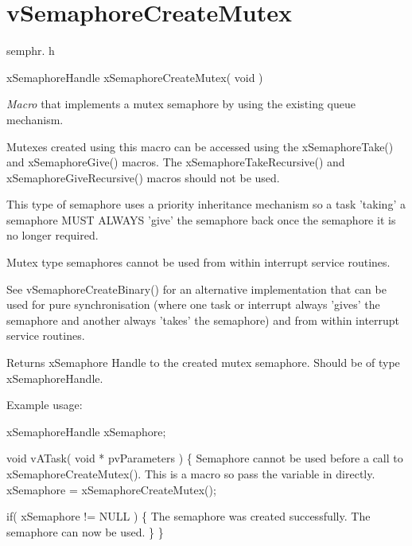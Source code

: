 \hypertarget{group__v_semaphore_create_mutex}{\section{v\-Semaphore\-Create\-Mutex}
\label{group__v_semaphore_create_mutex}
}
semphr. h 
\begin{DoxyPre}xSemaphoreHandle xSemaphoreCreateMutex( void )\end{DoxyPre}


{\itshape Macro} that implements a mutex semaphore by using the existing queue mechanism.

Mutexes created using this macro can be accessed using the x\-Semaphore\-Take() and x\-Semaphore\-Give() macros. The x\-Semaphore\-Take\-Recursive() and x\-Semaphore\-Give\-Recursive() macros should not be used.

This type of semaphore uses a priority inheritance mechanism so a task 'taking' a semaphore M\-U\-S\-T A\-L\-W\-A\-Y\-S 'give' the semaphore back once the semaphore it is no longer required.

Mutex type semaphores cannot be used from within interrupt service routines.

See v\-Semaphore\-Create\-Binary() for an alternative implementation that can be used for pure synchronisation (where one task or interrupt always 'gives' the semaphore and another always 'takes' the semaphore) and from within interrupt service routines.

\begin{DoxyReturn}{Returns}
x\-Semaphore Handle to the created mutex semaphore. Should be of type x\-Semaphore\-Handle.
\end{DoxyReturn}
Example usage\-: 
\begin{DoxyPre}
 xSemaphoreHandle xSemaphore;\end{DoxyPre}



\begin{DoxyPre} void vATask( void * pvParameters )
 \{
Semaphore cannot be used before a call to xSemaphoreCreateMutex().
This is a macro so pass the variable in directly.
    xSemaphore = xSemaphoreCreateMutex();\end{DoxyPre}



\begin{DoxyPre}    if( xSemaphore != NULL )
    \{
The semaphore was created successfully.
The semaphore can now be used.  
    \}
 \}
 \end{DoxyPre}


